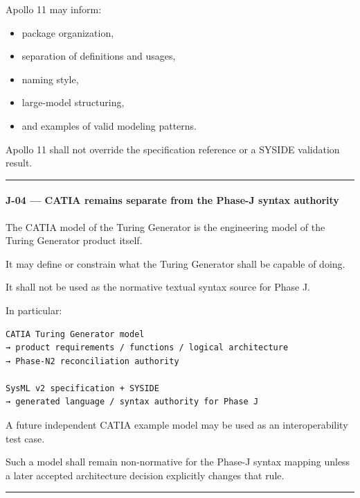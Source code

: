 Apollo 11 may inform:

\begin{itemize}
\tightlist
\item
  package organization,
\item
  separation of definitions and usages,
\item
  naming style,
\item
  large-model structuring,
\item
  and examples of valid modeling patterns.
\end{itemize}

Apollo 11 shall not override the specification reference or a SYSIDE validation result.

\begin{center}\rule{0.5\linewidth}{0.5pt}\end{center}

\hypertarget{j-04--catia-remains-separate-from-the-phase-j-syntax-authority}{%
\paragraph{J-04 --- CATIA remains separate from the Phase-J syntax authority}\label{j-04--catia-remains-separate-from-the-phase-j-syntax-authority}}

The CATIA model of the Turing Generator is the engineering model of the Turing Generator product itself.

It may define or constrain what the Turing Generator shall be capable of doing.

It shall not be used as the normative textual syntax source for Phase J.

In particular:

\begin{verbatim}
CATIA Turing Generator model
→ product requirements / functions / logical architecture
→ Phase-N2 reconciliation authority

SysML v2 specification + SYSIDE
→ generated language / syntax authority for Phase J
\end{verbatim}

A future independent CATIA example model may be used as an interoperability test case.

Such a model shall remain non-normative for the Phase-J syntax mapping unless a later accepted architecture decision explicitly changes that rule.

\begin{center}\rule{0.5\linewidth}{0.5pt}\end{center}

